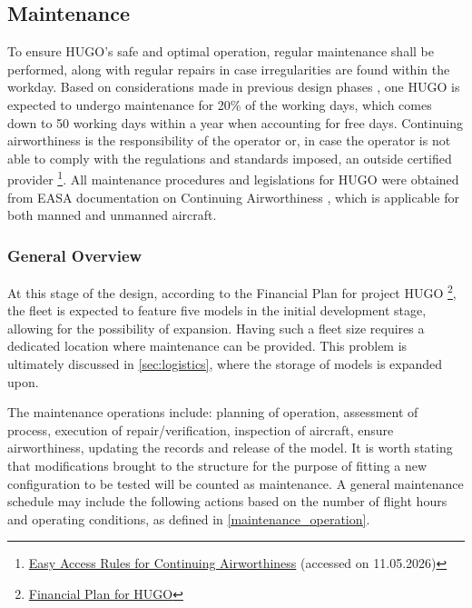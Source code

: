 \subsection{Maintenance}
\label{subsec:maintenance}
To ensure HUGO's safe and optimal operation, regular maintenance shall be performed, along with regular repairs in case irregularities are found within the workday. Based on considerations made in previous design phases , one HUGO is expected to undergo maintenance for 20\% of the working days, which comes down to 50 working days within a year when accounting for free days. Continuing airworthiness is the responsibility of the operator or, in case the operator is not able to comply with the regulations and standards imposed, an outside certified provider \footnote{\label{Easa_Maintenance}\href{https://www.easa.europa.eu/en/document-library/easy-access-rules/online-publications/easy-access-rules-continuing-airworthiness?erules-id=ERULES-1963177438-693}{Easy Access Rules for Continuing Airworthiness} (accessed on 11.05.2026)}. All maintenance procedures and legislations for HUGO were obtained from EASA documentation on Continuing Airworthiness , which is applicable for both manned and unmanned aircraft.

\subsubsection*{General Overview}
At this stage of the design, according to the Financial Plan for project HUGO \footnote{\label{url-finanical-plan}\href{https://github.com/Teo-Cokonaj/DSE-28/blob/main/docs/excel-files/financial-plan.xlsm}{Financial Plan for HUGO}}, the fleet is expected to feature five models in the initial development stage, allowing for the possibility of expansion. Having such a fleet size requires a dedicated location where maintenance can be provided. This problem is ultimately discussed in \autoref{sec:logistics}, where the storage of models is expanded upon.

The maintenance operations include: planning of operation, assessment of process, execution of repair/verification, inspection of aircraft, ensure airworthiness, updating the records and release of the model. It is worth stating that modifications brought to the structure for the purpose of fitting a new configuration to be tested will be counted as maintenance. A general maintenance schedule may include the following actions based on the number of flight hours and operating conditions, as defined in \autoref{maintenance_operation}.


